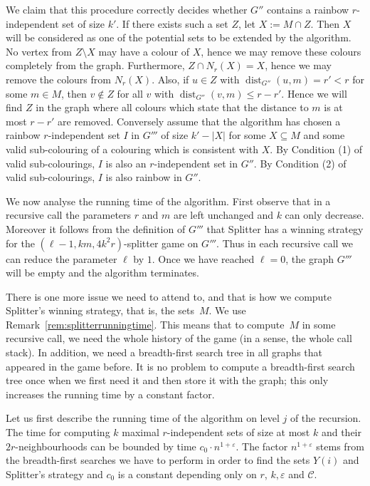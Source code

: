 \documentclass[11pt]{article}
\numberwithin{equation}{section}
\newcommand{\CCC}{\mathcal{C}} \newcommand{\DDD}{\mathcal{D}}
\newcommand{\dist}{\operatorname{dist}}
\renewcommand{\epsilon}{\varepsilon}
\begin{document}
  We claim that this procedure correctly decides whether $G''$
  contains a rainbow $r$-independent set of size $k'$. If there
  exists such a set $Z$, let $X:=M\cap Z$. Then $X$ will be considered
  as one of the potential sets to be extended by the algorithm. No
  vertex from $Z\setminus X$ may have a colour of $X$, hence we may
  remove these colours completely from the graph. Furthermore, $Z\cap
  N_r(X) = X$, hence we may remove the colours from $N_r(X)$. Also, if
  $u\in Z$ with $\dist_{G''}(u,m)=r'< r$ for some $m\in M$, then
  $v\not\in Z$ for all $v$ with $\dist_{G''}(v,m)\leq r-r'$. Hence we
  will find $Z$ in the graph where all colours which state that the
  distance to $m$ is at most $r-r'$ are removed. Conversely assume
  that the algorithm has chosen a rainbow $r$-independent set $I$ in
  $G'''$ of size $k'-|X|$ for some $X\subseteq M$ and some valid
  sub-colouring of a colouring which is consistent with $X$. By
  Condition (1) of valid sub-colourings, $I$ is also an
  $r$-independent set in $G''$. By Condition (2) of valid
  sub-colourings, $I$ is also rainbow in $G''$. 

  We now analyse the running time of the algorithm. First observe that
  in a recursive call the parameters $r$ and $m$ are left
  unchanged and $k$ can only decrease. Moreover it follows from the definition of $G'''$ that
  Splitter has a winning strategy for the $(\ell-1, km, 4k^2r)$-splitter
  game on $G'''$. Thus in each recursive call we can reduce the parameter $\ell$ by $1$. Once
  we have reached $\ell=0$, the graph $G'''$ will be empty and the
  algorithm terminates. 

  There is one more issue we need to attend to, and that is how we
  compute Splitter's winning strategy, that is, the sets~$M$. We use
  Remark~\ref{rem:splitterrunningtime}. This means that to compute~$M$
  in some recursive call, we need the whole history of the game (in a
  sense, the whole call stack). In addition, we need a breadth-first
  search tree in all graphs that appeared in the game before. It is no
  problem to compute a breadth-first search tree once when we first
  need it and then store it with the graph; this only increases the
  running time by a constant factor.

  
  Let us first describe the running time of the algorithm on level $j$
  of the recursion.  The time for computing $k$ maximal
  $r$-independent sets of size at most $k$ and their
  $2r$-neighbourhoods can be bounded by time $c_0\cdot
  n^{1+\epsilon}$. The factor $n^{1+\epsilon}$ stems from the
  breadth-first searches we have to perform in order to find the sets
  $Y(i)$ and Splitter's strategy and $c_0$ is a constant depending
  only on $r$, $k, \epsilon$ and $\CCC$.
\end{document}
